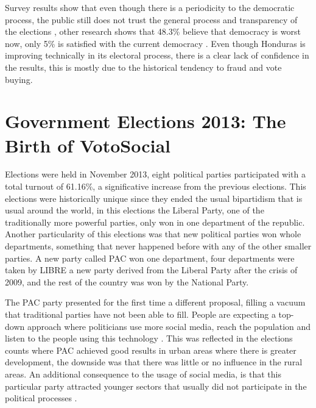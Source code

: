 \documentclass[letterpaper,10pt]{article}
\begin{document}
Survey results show that even though there is a periodicity to the democratic process, the public still does not trust the general process and transparency of the elections \citep{romero2014}, other research shows that 48.3\% believe that democracy is worst now, only 5\% is satisfied with the current democracy \citep{latinbar}. Even though Honduras is improving technically in its electoral process, there is a clear lack of confidence in the results, this is mostly due to the historical tendency to fraud and vote buying.

\section{Government Elections 2013: The Birth of VotoSocial}

Elections were held in November 2013, eight political parties participated with a total turnout of 61.16\%, a significative increase from the previous elections. This elections were historically unique since they ended the usual bipartidism that is usual around the world, in this elections the Liberal Party, one of the traditionally more powerful parties, only won in one department of the republic. Another particularity of this elections was that new political parties won whole departments, something that never happened before with any of the other smaller parties. A new party called PAC won one department, four departments were taken by LIBRE a new party derived from the Liberal Party after the crisis of 2009, and the rest of the country was won by the National Party.

The PAC party presented for the first time a different proposal, filling a vacuum that traditional parties have not been able to fill. People are expecting a top-down approach where politicians use more social media, reach the population and listen to the people using this technology \citep{map2014}. This was reflected in the elections counts where PAC achieved good results in urban areas where there is greater development, the downside was that there was little or no influence in the rural areas. An additional consequence to the usage of social media, is that this particular party attracted younger sectors that usually did not participate in the political processes \citep{romero2014}.
\end{document}

